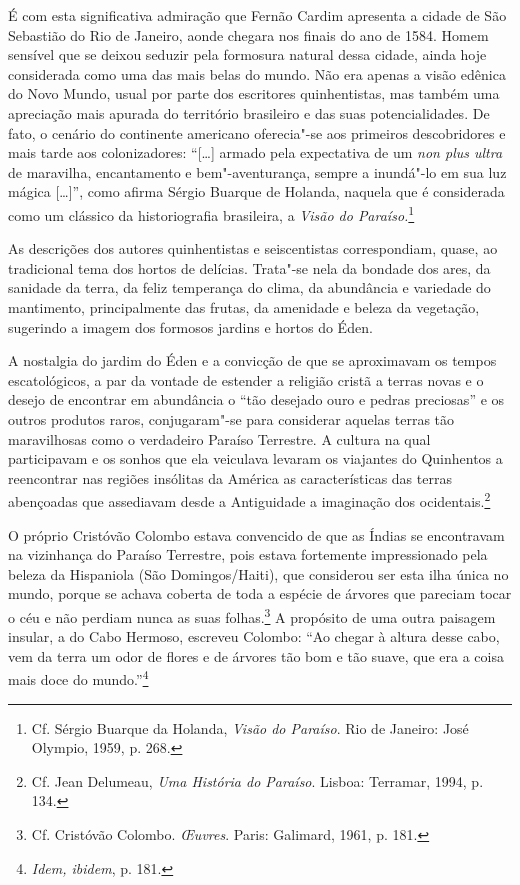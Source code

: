 É com esta significativa admiração que Fernão Cardim
apresenta a cidade de São Sebastião do Rio de Janeiro, aonde chegara nos
finais do ano de 1584. Homem sensível que se deixou seduzir pela
formosura natural dessa cidade, ainda hoje considerada como uma das
mais belas do mundo. Não era apenas a visão edênica do Novo Mundo,
usual por parte dos escritores quinhentistas, mas também uma
apreciação mais apurada do território brasileiro e das suas
potencialidades. De fato, o cenário do continente americano
oferecia"-se aos primeiros descobridores e mais tarde aos
colonizadores: ``[\ldots{}] armado pela expectativa de um \textit{non plus ultra} de maravilha, 
encantamento e bem"-aventurança, sempre a inundá"-lo em sua luz mágica [\ldots{}]'',
como afirma Sérgio Buarque de Holanda, naquela que
é considerada como um clássico da historiografia brasileira, a
\textit{Visão do Paraíso.}\footnote{ Cf. Sérgio Buarque da Holanda,
\textit{Visão do Paraíso}. Rio de Janeiro: José Olympio, 1959, p. 268.}

As descrições dos autores quinhentistas e seiscentistas
correspondiam, quase, ao tradicional tema dos hortos de delícias.
Trata"-se nela da bondade dos ares, da sanidade da terra, da feliz
temperança do clima, da abundância e variedade do mantimento,
principalmente das frutas, da amenidade e beleza da vegetação,
sugerindo a imagem dos formosos jardins e hortos do Éden.

A nostalgia do jardim do Éden e a convicção de que se aproximavam os
tempos escatológicos, a par da vontade de estender a religião cristã a
terras novas e o desejo de encontrar em abundância o ``tão desejado
ouro e pedras preciosas'' e os outros produtos raros, conjugaram"-se
para considerar aquelas terras tão maravilhosas como o verdadeiro
Paraíso Terrestre. A cultura na qual participavam e os sonhos que ela
veiculava levaram os viajantes do Quinhentos a reencontrar nas regiões
insólitas da América as características das terras abençoadas que
assediavam desde a Antiguidade a imaginação dos ocidentais.\footnote{ Cf. Jean Delumeau, 
\textit{Uma História do Paraíso}. Lisboa: Terramar, 1994, p. 134.} 

 O próprio Cristóvão Colombo estava convencido de que as 
Índias se encontravam na vizinhança do Paraíso Terrestre, pois estava
fortemente impressionado pela beleza da Hispaniola (São
Domingos/Haiti), que considerou ser esta ilha única no mundo, porque se
achava coberta de toda a espécie de árvores que pareciam tocar o céu e
não perdiam nunca as suas folhas.\footnote{ Cf. Cristóvão
Colombo. \textit{\OE uvres}. Paris: Galimard, 1961, p. 181.} A
propósito de uma outra paisagem insular, a do Cabo Hermoso, escreveu
Colombo: ``Ao chegar à altura desse cabo, vem da terra um
odor de flores e de árvores tão bom e tão suave, que era a coisa mais
doce do mundo.''\footnote{ \textit{Idem, ibidem}, p. 181.} 

